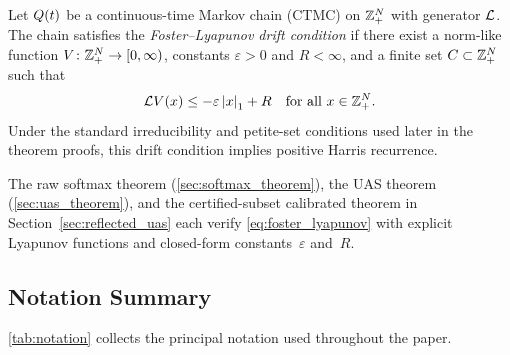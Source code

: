 \begin{definition}
\label{def:foster_lyapunov}
Let $Q(t)$ be a continuous-time Markov chain (CTMC) on $\mathbb{Z}_+^N$ with generator $\mathcal{L}$. The chain satisfies the \emph{Foster--Lyapunov drift condition} if there exist a norm-like function $V \colon \mathbb{Z}_+^N \to [0,\infty)$, constants $\varepsilon > 0$ and $R < \infty$, and a finite set $C \subset \mathbb{Z}_+^N$ such that
\begin{equation}
\label{eq:foster_lyapunov}
\mathcal{L} V(x) \leq -\varepsilon \left\lvert x \right\rvert_1 + R \quad \text{for all } x \in \mathbb{Z}_+^N.
\end{equation}
Under the standard irreducibility and petite-set conditions used later in the theorem proofs, this drift condition implies positive Harris recurrence.
\end{definition}

The raw softmax theorem (\cref{sec:softmax_theorem}), the UAS theorem (\cref{sec:uas_theorem}), and the certified-subset calibrated theorem in Section~\ref{sec:reflected_uas} each verify \cref{eq:foster_lyapunov} with explicit Lyapunov functions and closed-form constants~$\varepsilon$ and~$R$.

\subsection{Notation Summary}
\label{sec:model:notation}

\cref{tab:notation} collects the principal notation used throughout the paper.

